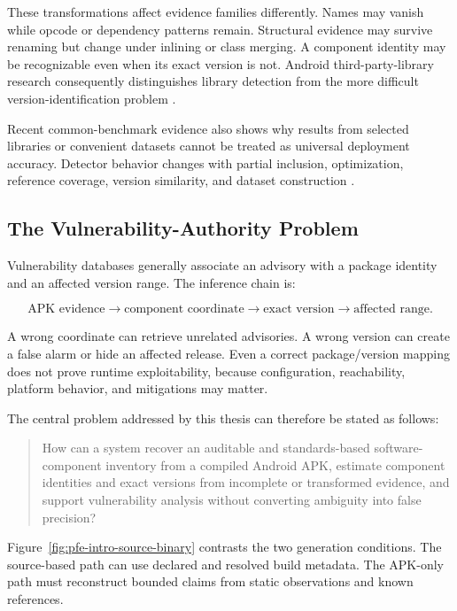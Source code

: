 These transformations affect evidence families differently. Names may vanish
while opcode or dependency patterns remain. Structural evidence may survive
renaming but change under inlining or class merging. A component identity may
be recognizable even when its exact version is not. Android
third-party-library research consequently distinguishes library detection
from the more difficult version-identification problem
\cite{backes2016libscout,zhan2021atvhunter,zhou2025sad}.

Recent common-benchmark evidence also shows why results from selected
libraries or convenient datasets cannot be treated as universal deployment
accuracy. Detector behavior changes with partial inclusion, optimization,
reference coverage, version similarity, and dataset construction
\cite{zhan2021systematic,gu2025tplbenchmark}.

\subsection{The Vulnerability-Authority Problem}

Vulnerability databases generally associate an advisory with a package
identity and an affected version range. The inference chain is:

\[
\text{APK evidence}
\rightarrow
\text{component coordinate}
\rightarrow
\text{exact version}
\rightarrow
\text{affected range}.
\]

A wrong coordinate can retrieve unrelated advisories. A wrong version can
create a false alarm or hide an affected release. Even a correct
package/version mapping does not prove runtime exploitability, because
configuration, reachability, platform behavior, and mitigations may matter.

The central problem addressed by this thesis can therefore be stated as
follows:

\begin{quote}
How can a system recover an auditable and standards-based software-component
inventory from a compiled Android APK, estimate component identities and exact
versions from incomplete or transformed evidence, and support vulnerability
analysis without converting ambiguity into false precision?
\end{quote}

Figure~\ref{fig:pfe-intro-source-binary} contrasts the two generation
conditions. The source-based path can use declared and resolved build
metadata. The APK-only path must reconstruct bounded claims from static
observations and known references.

